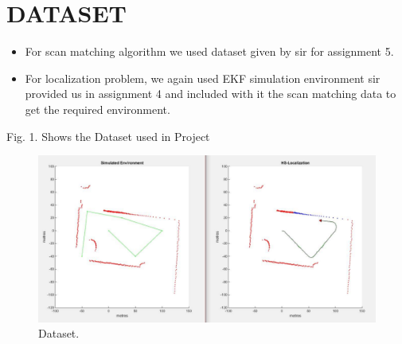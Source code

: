 \documentclass[letterpaper, 10 pt, conference]{ieeeconf}  %
\begin{document}
\section{DATASET}
\begin{itemize}
\item For scan matching algorithm we used dataset given by sir for assignment 5.
\item For localization problem, we again used EKF simulation environment sir provided us in assignment 4 and included with it the scan matching data to get the required environment.
\end{itemize}
Fig. 1. Shows the Dataset used in Project
\begin{figure}[h]
  \includegraphics[width=\linewidth]{dataset.jpg}
  \caption{Dataset.}
  \label{fig:dataset}
\end{figure}
\end{document}

